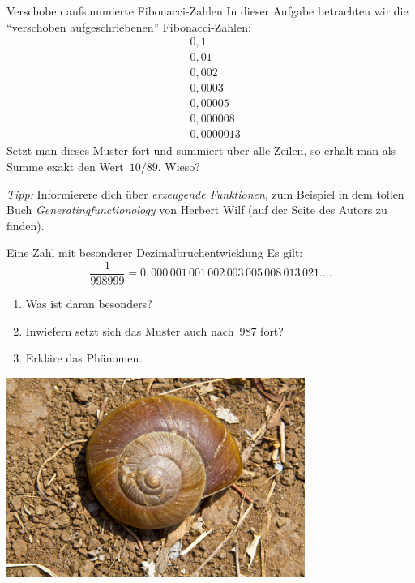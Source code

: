 \documentclass[a4paper,ngerman,twoside]{scrartcl}
\newlength{\aufgabenskip}
\newcounter{aufgabennummer}
\newenvironment{aufgabe*}[1]{
  \addtocounter{aufgabennummer}{1}
  \textbf{Aufgabe* \theaufgabennummer.} \emph{#1} \par
}{\vspace{\aufgabenskip}}
\begin{document}
\begin{aufgabe*}{Verschoben aufsummierte Fibonacci-Zahlen}
In dieser Aufgabe betrachten wir die "`verschoben aufgeschriebenen"'
Fibonacci-Zahlen:
\begin{align*}
&0{,}1 \\
&0{,}01 \\
&0{,}002 \\
&0{,}0003 \\
&0{,}00005 \\
&0{,}000008 \\
&0{,}0000013
\end{align*}
Setzt man dieses Muster fort und summiert über alle Zeilen, so erhält man als
Summe exakt den Wert~$10/89$. Wieso?

\emph{Tipp:} Informierere dich über \emph{erzeugende Funktionen}, zum Beispiel
in dem tollen Buch \emph{Generatingfunctionology} von Herbert Wilf (auf der
Seite des Autors zu finden).
\end{aufgabe*}

\begin{aufgabe*}{Eine Zahl mit besonderer Dezimalbruchentwicklung}
Es gilt:
\[ \frac{1}{998999} =
  0{,}000\,001\,001\,002\,003\,005\,008\,013\,021\ldots. \]
\begin{enumerate}
\item Was ist daran besonders?
\item Inwiefern setzt sich das Muster auch nach~$987$ fort?
\item Erkläre das Phänomen.
\end{enumerate}
\end{aufgabe*}

\vfill
\begin{center}\includegraphics[width=0.73\textwidth]{goldene-spirale-8}\end{center}
\end{document}
